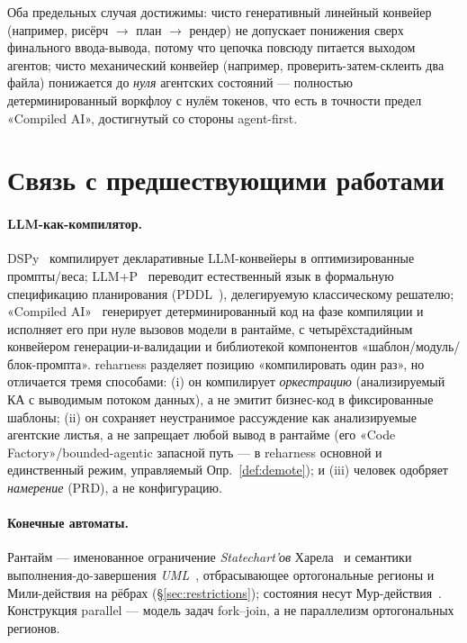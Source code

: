\documentclass[11pt]{article}
\theoremstyle{plain}
\theoremstyle{definition}
\theoremstyle{remark}
\newcommand{\reharness}{\textsf{reharness}}
\newcommand{\state}[1]{\textsf{#1}}
\begin{document}
Оба предельных случая достижимы: чисто генеративный линейный конвейер (например, рисёрч
$\to$ план $\to$ рендер) не допускает понижения сверх финального ввода-вывода, потому что
цепочка повсюду питается выходом агентов; чисто механический конвейер (например,
проверить-затем-склеить два файла) понижается до \emph{нуля} агентских состояний ---
полностью детерминированный воркфлоу с нулём токенов, что есть в точности предел
«Compiled AI», достигнутый со стороны agent-first.

\section{Связь с предшествующими работами}

\paragraph{LLM-как-компилятор.} DSPy~\cite{dspy} компилирует декларативные LLM-конвейеры в
оптимизированные промпты/веса; LLM+P~\cite{llmp} переводит естественный язык в формальную
спецификацию планирования (PDDL~\cite{pddl}), делегируемую классическому решателю;
«Compiled AI»~\cite{compiledai} генерирует детерминированный код на фазе компиляции и
исполняет его при нуле вызовов модели в рантайме, с четырёхстадийным конвейером
генерации-и-валидации и библиотекой компонентов «шаблон/модуль/блок-промпта». \reharness{}
разделяет позицию «компилировать один раз», но отличается тремя способами: (i) он
компилирует \emph{оркестрацию} (анализируемый КА с выводимым потоком данных), а не эмитит
бизнес-код в фиксированные шаблоны; (ii) он сохраняет неустранимое рассуждение как
анализируемые агентские листья, а не запрещает любой вывод в рантайме (его «Code
Factory»/bounded-agentic запасной путь --- в \reharness{} основной и единственный режим,
управляемый Опр.~\ref{def:demote}); и (iii) человек одобряет \emph{намерение} (PRD), а не
конфигурацию.

\paragraph{Конечные автоматы.} Рантайм --- именованное ограничение
\emph{Statechart'ов} Харела~\cite{harel} и семантики выполнения-до-завершения
\emph{UML}~\cite{uml,scxml,samek}, отбрасывающее ортогональные регионы и Мили-действия на
рёбрах (\S\ref{sec:restrictions}); состояния несут Мур-действия~\cite{moore}. Конструкция
\state{parallel} --- модель задач fork--join, а не параллелизм ортогональных регионов.
\end{document}
